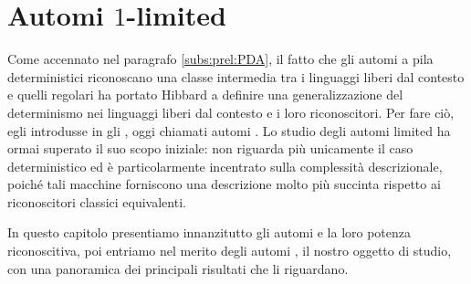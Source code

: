 \chapter{Automi \texorpdfstring{$1$}{1}-limited}\label{cha:a1l}
Come accennato nel paragrafo \ref{subs:prel:PDA}, il fatto che gli automi a pila deterministici riconoscano una classe intermedia tra i linguaggi liberi dal contesto e quelli regolari ha portato Hibbard a definire una generalizzazione del determinismo nei linguaggi liberi dal contesto e i loro riconoscitori. Per fare ciò, egli introdusse in \cite{Hibbard:67:CFdet} gli , oggi chiamati automi . Lo studio degli automi limited ha ormai superato il suo scopo iniziale: non riguarda più unicamente il caso deterministico ed è particolarmente incentrato sulla complessità descrizionale, poiché tali macchine forniscono una descrizione molto più succinta rispetto ai riconoscitori classici equivalenti.

In questo capitolo presentiamo innanzitutto gli automi  e la loro potenza riconoscitiva, poi entriamo nel merito degli automi , il nostro oggetto di studio, con una panoramica dei principali risultati che li riguardano.




